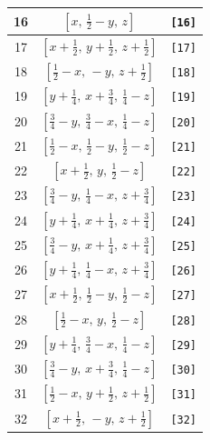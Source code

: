 \documentclass[fleqn,8pt]{jsarticle}
\begin{document}
\begin{longtable}{ccc}
16 & $\left[ x,\, \frac{1}{2} - y,\, z \right]$ & {\tt [16]} \\ \hline
17 & $\left[ x + \frac{1}{2},\, y + \frac{1}{2},\, z + \frac{1}{2} \right]$ & {\tt [17]} \\ \hline
18 & $\left[ \frac{1}{2} - x,\, - y,\, z + \frac{1}{2} \right]$ & {\tt [18]} \\ \hline
19 & $\left[ y + \frac{1}{4},\, x + \frac{3}{4},\, \frac{1}{4} - z \right]$ & {\tt [19]} \\ \hline
20 & $\left[ \frac{3}{4} - y,\, \frac{3}{4} - x,\, \frac{1}{4} - z \right]$ & {\tt [20]} \\ \hline
21 & $\left[ \frac{1}{2} - x,\, \frac{1}{2} - y,\, \frac{1}{2} - z \right]$ & {\tt [21]} \\ \hline
22 & $\left[ x + \frac{1}{2},\, y,\, \frac{1}{2} - z \right]$ & {\tt [22]} \\ \hline
23 & $\left[ \frac{3}{4} - y,\, \frac{1}{4} - x,\, z + \frac{3}{4} \right]$ & {\tt [23]} \\ \hline
24 & $\left[ y + \frac{1}{4},\, x + \frac{1}{4},\, z + \frac{3}{4} \right]$ & {\tt [24]} \\ \hline
25 & $\left[ \frac{3}{4} - y,\, x + \frac{1}{4},\, z + \frac{3}{4} \right]$ & {\tt [25]} \\ \hline
26 & $\left[ y + \frac{1}{4},\, \frac{1}{4} - x,\, z + \frac{3}{4} \right]$ & {\tt [26]} \\ \hline
27 & $\left[ x + \frac{1}{2},\, \frac{1}{2} - y,\, \frac{1}{2} - z \right]$ & {\tt [27]} \\ \hline
28 & $\left[ \frac{1}{2} - x,\, y,\, \frac{1}{2} - z \right]$ & {\tt [28]} \\ \hline
29 & $\left[ y + \frac{1}{4},\, \frac{3}{4} - x,\, \frac{1}{4} - z \right]$ & {\tt [29]} \\ \hline
30 & $\left[ \frac{3}{4} - y,\, x + \frac{3}{4},\, \frac{1}{4} - z \right]$ & {\tt [30]} \\ \hline
31 & $\left[ \frac{1}{2} - x,\, y + \frac{1}{2},\, z + \frac{1}{2} \right]$ & {\tt [31]} \\ \hline
32 & $\left[ x + \frac{1}{2},\, - y,\, z + \frac{1}{2} \right]$ & {\tt [32]} \\
\end{longtable}
\end{document}
